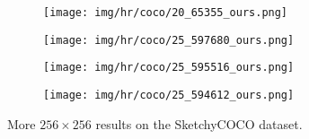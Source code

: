 \documentclass[10pt,twocolumn,letterpaper]{article}
\begin{document}
\begin{figure*}[tbp]
\begin{center}
  \begin{subfigure}[b]{\inwidth\linewidth}
  \texttt{[image: img/hr/coco/20\_65355\_ours.png]}
  \end{subfigure}
  \begin{subfigure}[b]{\inwidth\linewidth}
  \texttt{[image: img/hr/coco/25\_597680\_ours.png]}
  \end{subfigure}
\begin{subfigure}[b]{\inwidth\linewidth}
  \texttt{[image: img/hr/coco/25\_595516\_ours.png]}
  \end{subfigure}
  \begin{subfigure}[b]{\inwidth\linewidth}
  \texttt{[image: img/hr/coco/25\_594612\_ours.png]}
  \end{subfigure}
  
\end{center}
\caption{More $256\times 256$ results on the SketchyCOCO dataset.}
 \label{fig:hr_coco}

\end{figure*}
\end{document}

